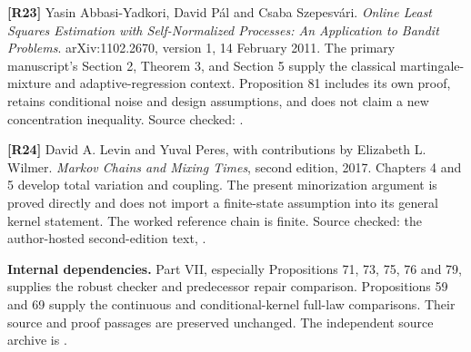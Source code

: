 \documentclass[11pt,letterpaper]{article}
\begin{document}
\textbf{{[}R23{]}} Yasin Abbasi-Yadkori, David Pál and Csaba Szepesvári.
\emph{Online Least Squares Estimation with Self-Normalized Processes: An
Application to Bandit Problems}. arXiv:1102.2670, version 1, 14 February
2011. The primary manuscript's Section 2, Theorem 3, and Section 5
supply the classical martingale-mixture and adaptive-regression context.
Proposition 81 includes its own proof, retains conditional noise and
design assumptions, and does not claim a new concentration inequality.
Source checked: .

\textbf{{[}R24{]}} David A. Levin and Yuval Peres, with contributions by
Elizabeth L. Wilmer. \emph{Markov Chains and Mixing Times}, second
edition, 2017. Chapters 4 and 5 develop total variation and coupling.
The present minorization argument is proved directly and does not import
a finite-state assumption into its general kernel statement. The worked
reference chain is finite. Source checked: the author-hosted
second-edition text,
.

\textbf{Internal dependencies.} Part VII, especially Propositions 71,
73, 75, 76 and 79, supplies the robust checker and predecessor repair
comparison. Propositions 59 and 69 supply the continuous and
conditional-kernel full-law comparisons. Their source and proof passages
are preserved unchanged. The independent source archive is
.

\endgroup
\end{document}
